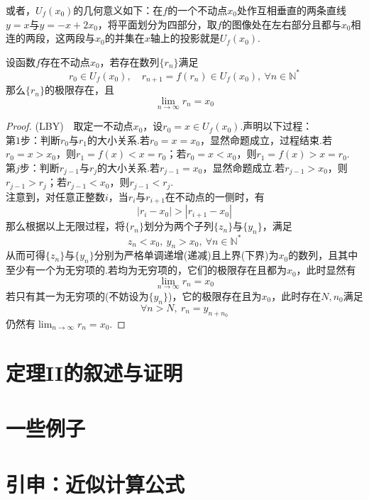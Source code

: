 \documentclass[lang=cn, zihao=5]{elegantbook}
\begin{document}
或者，$U_f(x_0)$的几何意义如下：在$f$的一个不动点$x_0$处作互相垂直的两条直线$y=x$与$y=-x+2x_0$，将平面划分为四部分，取$f$的图像处在左右部分且都与$x_0$相连的两段，这两段与$x_0$的并集在$x$轴上的投影就是$U_f(x_0)$.

\begin{theorem}
	设函数$f$存在不动点$x_0$，若存在数列$\{ r_n \}$满足$$r_0 \in U_f(x_0) ,\quad r_{n+1}=f(r_n) \in U_f(x_0),~\forall n \in \mathbb{N}^{*}$$
	那么$\{ r_n \}$的极限存在，且$$\lim_{n \to \infty} r_n = x_0$$
\end{theorem}

\begin{proof}
	(LBY)~~取定一不动点$x_0$，设$r_0 = x \in U_f(x_0)$.声明以下过程： \\
	第$1$步：判断$r_0$与$r_1$的大小关系.若$r_0=x=x_0$，显然命题成立，过程结束.若$r_0=x>x_0$，则$r_1=f(x)<x=r_0$；若$r_0=x<x_0$，则$r_1=f(x)>x=r_0$. \\
	第$j$步：判断$r_{j-1}$与$r_j$的大小关系.若$r_{j-1}=x_0$，显然命题成立.若$r_{j-1}>x_0$，则$r_{j-1}>r_j$；若$r_{j-1}<x_0$，则$r_{j-1}<r_j$. \\
	注意到，对任意正整数$i$，当$r_i$与$r_{i+1}$在不动点的一侧时，有$$|r_i-x_0| > |r_{i+1}-x_0|$$
	那么根据以上无限过程，将$\{ r_n \}$划分为两个子列$\{ z_n \}$与$\{ y_n \}$，满足$$z_n < x_0, ~ y_n > x_0 ,~\forall n \in \mathbb{N}^{*}$$
	从而可得$\{ z_n \}$与$\{ y_n \}$分别为严格单调递增(递减)且上界(下界)为$x_0$的数列，且其中至少有一个为无穷项的.若均为无穷项的，它们的极限存在且都为$x_0$，此时显然有$$\lim_{n \to \infty} r_n = x_0$$
	若只有其一为无穷项的(不妨设为$\{ y_n \}$)，它的极限存在且为$x_0$，此时存在$N,n_0$满足$$\forall n>N,~r_n = y_{n+n_0}$$
	仍然有$\lim_{n \to \infty} r_n = x_0$.
\end{proof}

\section*{定理II的叙述与证明}

\section*{一些例子}

\section*{引申：近似计算公式}
\end{document}
